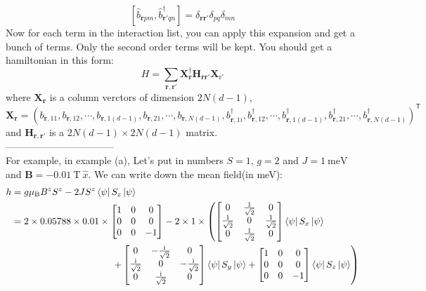\documentclass[letter]{article}
\newcommand{\ii}{\mathrm{i}}
\begin{document}
$$
\left[\hat{b}_{\bm{r}pm},\hat{b}^{\dagger}_{\bm{r}'qn}\right]=\delta_{\bm{r}\bm{r}'}\delta_{pq}\delta_{mn}$$
Now for each term in the interaction list, you can apply this expansion and get a bunch of terms. Only the second order terms will be kept. You should get a hamiltonian in this form:
 $$H=\sum_{\bm{r},\bm{r}'}\mathbf{X}^{\dagger}_{\bm{r}}\mathbf{H}_{\bm{r}\bm{r}'}\mathbf{X}_{\mathrm{r}'}$$
 where $\mathbf{X}_{\bm{r}}$ is a column verctors of dimension $2N(d-1)$, $$\mathbf{X}_{\bm{r}}=\left(b_{\bm{r},11},b_{\bm{r},12},\cdots,b_{\bm{r},1(d-1)},b_{\bm{r},21},\cdots,b_{\bm{r},N(d-1)},b_{\bm{r},1i}^{\dagger},b_{\bm{r},12}^{\dagger},\cdots,b_{\bm{r},1(d-1)}^{\dagger},b_{\bm{r},21}^{\dagger},\cdots,b_{\bm{r},N(d-1)}^{\dagger}\right)^{\mathsf{T}}$$
and $\mathbf{H}_{\bm{r},\bm{r}'}$ is a $2N(d-1)\times 2N(d-1)$ matrix.\\
---------------------------------\\
 For example, in example (a), Let's put in numbers $S=1$, $g=2$ and $J=\SI{1}{\milli\electronvolt}$
and $\bm{B}=-\SI{0.01}{\tesla}\ \hat{x}.$ We can write down the mean field(in meV):
$$\begin{aligned}
    h&=  g\mu_{\mathrm{B}} B^z S^z-2J S^z \left<\psi\right|S_z\left|\psi\right>\\
    & = 2\times 0.05788\times 0.01\times  \begin{bmatrix}
        1 & 0 & 0\\
       0 &  0 & 0\\
        0& 0 & -1
        \end{bmatrix}-2\times1\times\left( \begin{bmatrix}
            0 & \frac{1}{\sqrt{2}} & 0\\
            \frac{1}{\sqrt{2}} &  0 &\frac{1}{\sqrt{2}}\\
        0& \frac{1}{\sqrt{2}}& 0
            \end{bmatrix} \left<\psi\right|S_x\left|\psi\right>\right.\\
           & {\ \ \ \ \ \ \ \ \ \ \ \ \ \ }\indent \indent\indent\indent\left.+\begin{bmatrix}
                0& -\frac{\ii}{\sqrt{2}} & 0\\
                \frac{\ii}{\sqrt{2}} &  0 & -\frac{\ii}{\sqrt{2}}\\
            0& \frac{\ii}{\sqrt{2}}&0
                \end{bmatrix} \left<\psi\right|S_y\left|\psi\right>+\begin{bmatrix}
            1 & 0 & 0\\
        0 &  0 & 0\\
        0& 0&-1
            \end{bmatrix} \left<\psi\right|S_z\left|\psi\right>\right)
\end{aligned}$$
\end{document}
